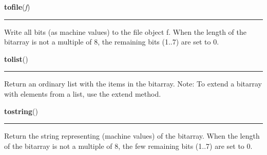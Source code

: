     \label{bitarray:_bitarray:tofile}

    \vspace{0.5ex}

    \begin{boxedminipage}{\textwidth}

    \raggedright \textbf{tofile}(\textit{f})

    \vspace{-1.5ex}

    \rule{\textwidth}{0.5\fboxrule}

Write all bits (as machine values) to the file object f.
When the length of the bitarray is not a multiple of 8,
the remaining bits (1..7) are set to 0.
    \vspace{1ex}

    \end{boxedminipage}

    \label{bitarray:_bitarray:tolist}

    \vspace{0.5ex}

    \begin{boxedminipage}{\textwidth}

    \raggedright \textbf{tolist}()

    \vspace{-1.5ex}

    \rule{\textwidth}{0.5\fboxrule}

Return an ordinary list with the items in the bitarray.
Note: To extend a bitarray with elements from a list,
use the extend method.
    \vspace{1ex}

    \end{boxedminipage}

    \label{bitarray:_bitarray:tostring}

    \vspace{0.5ex}

    \begin{boxedminipage}{\textwidth}

    \raggedright \textbf{tostring}()

    \vspace{-1.5ex}

    \rule{\textwidth}{0.5\fboxrule}

Return the string representing (machine values) of the bitarray.
When the length of the bitarray is not a multiple of 8, the few remaining
bits (1..7) are set to 0.
    \vspace{1ex}

    \end{boxedminipage}

